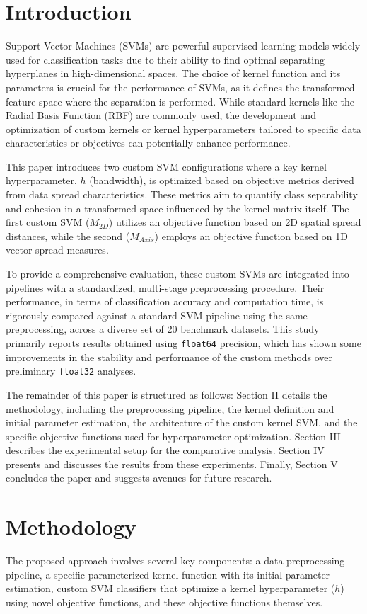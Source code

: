 \documentclass[conference]{IEEEtran} %
\begin{document}
\section{Introduction}
Support Vector Machines (SVMs) are powerful supervised learning models widely used for classification tasks due to their ability to find optimal separating hyperplanes in high-dimensional spaces. The choice of kernel function and its parameters is crucial for the performance of SVMs, as it defines the transformed feature space where the separation is performed. While standard kernels like the Radial Basis Function (RBF) are commonly used, the development and optimization of custom kernels or kernel hyperparameters tailored to specific data characteristics or objectives can potentially enhance performance.

This paper introduces two custom SVM configurations where a key kernel hyperparameter, $h$ (bandwidth), is optimized based on objective metrics derived from data spread characteristics. These metrics aim to quantify class separability and cohesion in a transformed space influenced by the kernel matrix itself. The first custom SVM ($M_{2D}$) utilizes an objective function based on 2D spatial spread distances, while the second ($M_{Axis}$) employs an objective function based on 1D vector spread measures.

To provide a comprehensive evaluation, these custom SVMs are integrated into pipelines with a standardized, multi-stage preprocessing procedure. Their performance, in terms of classification accuracy and computation time, is rigorously compared against a standard SVM pipeline using the same preprocessing, across a diverse set of 20 benchmark datasets. This study primarily reports results obtained using \texttt{float64} precision, which has shown some improvements in the stability and performance of the custom methods over preliminary \texttt{float32} analyses.

The remainder of this paper is structured as follows: Section II details the methodology, including the preprocessing pipeline, the kernel definition and initial parameter estimation, the architecture of the custom kernel SVM, and the specific objective functions used for hyperparameter optimization. Section III describes the experimental setup for the comparative analysis. Section IV presents and discusses the results from these experiments. Finally, Section V concludes the paper and suggests avenues for future research.

\section{Methodology}
The proposed approach involves several key components: a data preprocessing pipeline, a specific parameterized kernel function with its initial parameter estimation, custom SVM classifiers that optimize a kernel hyperparameter ($h$) using novel objective functions, and these objective functions themselves.
\end{document}
